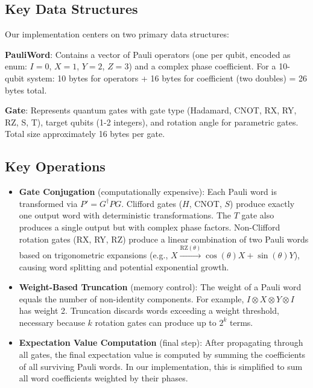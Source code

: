 \documentclass[11pt, a4paper]{article}
\begin{document}
\subsection{Key Data Structures}

Our implementation centers on two primary data structures:

\noindent \textbf{PauliWord}: Contains a vector of Pauli operators (one per qubit, encoded as enum: $I=0$, $X=1$, $Y=2$, $Z=3$) and a complex phase coefficient. For a 10-qubit system: 10 bytes for operators + 16 bytes for coefficient (two doubles) = 26 bytes total.

\noindent \textbf{Gate}: Represents quantum gates with gate type (Hadamard, CNOT, RX, RY, RZ, S, T), target qubits (1-2 integers), and rotation angle for parametric gates. Total size approximately 16 bytes per gate.

\subsection{Key Operations}
\begin{itemize}
    \item \textbf{Gate Conjugation} (computationally expensive): Each Pauli word is transformed via $P' = G^\dagger P G$. Clifford gates ($H$, CNOT, $S$) produce exactly one output word with deterministic transformations. The $T$ gate also produces a single output but with complex phase factors. Non-Clifford rotation gates (RX, RY, RZ) produce a linear combination of two Pauli words based on trigonometric expansions (e.g., $X \xrightarrow{\text{RZ}(\theta)} \cos(\theta)X + \sin(\theta)Y$), causing word splitting and potential exponential growth.

    \item \textbf{Weight-Based Truncation} (memory control): The weight of a Pauli word equals the number of non-identity components. For example, $I \otimes X \otimes Y \otimes I$ has weight 2. Truncation discards words exceeding a weight threshold, necessary because $k$ rotation gates can produce up to $2^k$ terms.

    \item \textbf{Expectation Value Computation} (final step): After propagating through all gates, the final expectation value is computed by summing the coefficients of all surviving Pauli words. In our implementation, this is simplified to sum all word coefficients weighted by their phases.

    \end{itemize}
\end{document}
